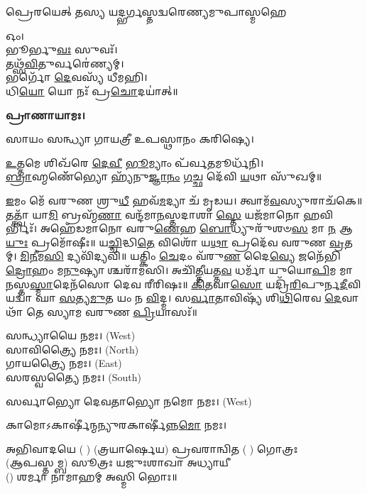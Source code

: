 {𑌪𑍍𑌰𑍇𑌰𑌯𑍇𑌤𑍍 𑌤𑌸𑍍𑌯 𑌯𑌦𑍍𑌭𑌰𑍍𑌗𑌸𑍍𑌤𑌦𑍍𑌵𑌰𑍇𑌣𑍍𑌯𑌮𑍁𑌪𑌾𑌸𑍍𑌮𑌹𑍇}


𑌓𑌂।\\
𑌭𑍂𑌰𑍍𑌭𑍁\-\ul{𑌵𑌃} 𑌸𑍁𑌵𑌃᳴।\\
𑌤𑌥𑍍𑌸᳴\-\ul{𑌵𑌿}\-𑌤𑍁𑌰𑍍𑌵𑌰𑍇॑𑌣𑍍𑌯𑌮𑍍।\\
𑌭𑌰𑍍𑌗𑍋᳴ \ul{𑌦𑍇}\-𑌵𑌸𑍍𑌯᳴ 𑌧𑍀𑌮𑌹𑌿।\\
𑌧𑌿\-\ul{𑌯𑍋} 𑌯𑍋 𑌨𑌃᳴ 𑌪𑍍𑌰\-\ul{𑌚𑍋}\-𑌦𑌯𑌾॑𑌤𑍍॥

\textbf{𑌪𑍍𑌰𑌾𑌣𑌾𑌯𑌾𑌮𑌃।}


𑌸𑌾𑌯𑌂 𑌸𑌨𑍍𑌧𑍍𑌯𑌾 𑌗𑌾𑌯𑌤𑍍𑌰𑍀 𑌉𑌪𑌸𑍍𑌥𑌾𑌨𑌂 𑌕𑌰𑌿𑌷𑍍𑌯𑍇।

\-\ul{𑌉}\-𑌤𑍍𑌤𑌮𑍇 𑌶𑌿𑌖᳴𑌰𑍇 \ul{𑌦𑍇}\-\-\ul{𑌵𑍀} \ul{𑌭𑍂}\-𑌮𑍍𑌯𑌾𑌂 𑌪᳴𑌰𑍍𑌵\-\ul{𑌤}\-𑌮𑍂𑌰𑍍𑌧᳴𑌨𑌿।\\
\-\ul{𑌬𑍍𑌰𑌾}\-𑌹𑍍𑌮𑌣𑍇᳴᳴𑌭𑍍𑌯𑍋 𑌹𑍍𑌯᳴𑌨𑍁\-\ul{𑌜𑍍𑌞𑌾}\-\-\ul{𑌨𑌂} \ul{𑌗}\-𑌚𑍍𑌛 𑌦𑍇᳴𑌵𑌿 \ul{𑌯}\-𑌥𑌾 𑌸𑍁᳴𑌖𑌮𑍍॥


\-\ul{𑌇}\-𑌮𑌂 𑌮𑍇᳴ 𑌵𑌰𑍁𑌣 𑌶𑍍𑌰𑍁\-\ul{𑌧𑍀} 𑌹𑌵᳴\-\ul{𑌮}\-𑌦𑍍𑌯𑌾 𑌚᳴ 𑌮𑍃𑌡𑌯। 𑌤𑍍𑌵𑌾𑌮᳴\-\ul{𑌵}\-𑌸𑍍𑌯𑍁𑌰𑌾𑌚᳴𑌕𑍇॥ 𑌤𑌤𑍍𑌤𑍍𑌵𑌾᳴ 𑌯𑌾\-\ul{𑌮𑌿} 𑌬𑍍𑌰𑌹𑍍𑌮᳴\-\ul{𑌣𑌾} 𑌵𑌨𑍍𑌦᳴𑌮𑌾\-\ul{𑌨}\-𑌸𑍍𑌤𑌦𑌾𑌶𑌾\-\ul{𑌸𑍍𑌤𑍇} 𑌯𑌜᳴𑌮𑌾𑌨𑍋 \ul{𑌹}\-𑌵𑌿𑌰𑍍𑌭𑌿𑌃᳴। 𑌅𑌹𑍇᳴𑌡𑌮𑌾𑌨𑍋 𑌵𑌰𑍁\-\ul{𑌣𑍇}\-𑌹 \ul{𑌬𑍋}\-𑌧𑍍𑌯𑍁𑌰𑍁᳴𑌶𑍞\-\ul{𑌸} 𑌮𑌾 \ul{𑌨} 𑌆\-\ul{𑌯𑍁𑌃} 𑌪𑍍𑌰𑌮𑍋᳴𑌷𑍀𑌃॥
𑌯\-\ul{𑌚𑍍𑌚𑌿}\-𑌦𑍍𑌧𑌿\-\ul{𑌤𑍇} 𑌵𑌿𑌶𑍋᳴ 𑌯\-\ul{𑌥𑌾} 𑌪𑍍𑌰𑌦𑍇᳴𑌵 𑌵𑌰𑍁𑌣 \ul{𑌵𑍍𑌰}\-𑌤𑌮𑍍। \ul{𑌮𑌿}\-\-\ul{𑌨𑍀}\-𑌮\-\ul{𑌸𑌿} 𑌦𑍍𑌯𑌵𑌿᳴𑌦𑍍𑌯𑌵𑌿॥ 𑌯𑌤𑍍𑌕𑌿𑌂 \ul{𑌚𑍇}\-𑌦𑌂 𑌵᳴𑌰𑍁\-\ul{𑌣} 𑌦𑍈\-\ul{𑌵𑍍𑌯𑍇} 𑌜𑌨𑍇᳴𑌭𑌿\-\ul{𑌦𑍍𑌰𑍋}\-𑌹𑌂 𑌮\-\ul{𑌨𑍁}\-𑌷𑍍𑌯𑌾𑌶𑍍𑌚𑌰𑌾᳴𑌮𑌸𑌿। 𑌅𑌚𑌿᳴\-\ul{𑌤𑍍𑌤𑍀}\-𑌯𑌤𑍍𑌤\-\ul{𑌵} 𑌧𑌰𑍍𑌮𑌾᳴ 𑌯𑍁𑌯𑍋\-\ul{𑌪𑌿}\-𑌮 𑌮𑌾 \ul{𑌨}\-𑌸𑍍𑌤\-\ul{𑌸𑍍𑌮𑌾}\-𑌦𑍇𑌨᳴𑌸𑍋 𑌦𑍇𑌵 𑌰𑍀𑌰𑌿𑌷𑌃॥ \ul{𑌕𑌿}\-\-\ul{𑌤}\-𑌵𑌾\-\ul{𑌸𑍋} 𑌯𑌦𑍍𑌰𑌿᳴\-\ul{𑌰𑌿}\-𑌪𑍁𑌰𑍍𑌨\-\ul{𑌦𑍀}\-𑌵𑌿 𑌯𑌦𑍍𑌵𑌾᳴ 𑌘𑌾 \ul{𑌸}\-𑌤𑍍𑌯\-\ul{𑌮𑍁}\-𑌤 𑌯𑌂 𑌨 \ul{𑌵𑌿}\-𑌦𑍍𑌮। 𑌸\-\ul{𑌰𑍍𑌵𑌾}\-𑌤𑌾𑌵𑌿𑌷𑍍𑌯᳴ 𑌶𑌿\-\ul{𑌥𑌿}\-𑌰𑍇𑌵 \ul{𑌦𑍇}\-𑌵𑌾𑌥𑌾᳴ 𑌤𑍇 𑌸𑍍𑌯𑌾𑌮 𑌵𑌰𑍁𑌣 \ul{𑌪𑍍𑌰𑌿}\-𑌯𑌾𑌸𑌃᳴॥


𑌸𑌨𑍍𑌧𑍍𑌯𑌾𑌯𑍈 𑌨𑌮𑌃।  {\scriptsize (West)}\\
𑌸𑌾𑌵𑌿𑌤𑍍𑌰𑍍𑌯𑍈 𑌨𑌮𑌃। {\scriptsize (North)}\\
𑌗𑌾𑌯𑌤𑍍𑌰𑍍𑌯𑍈 𑌨𑌮𑌃।  {\scriptsize (East)}\\
𑌸𑌰𑌸𑍍𑌵𑌤𑍍𑌯𑍈 𑌨𑌮𑌃।  {\scriptsize (South)}

𑌸𑌰𑍍𑌵𑌾𑌭𑍍𑌯𑍋 𑌦𑍇𑌵𑌤𑌾𑌭𑍍𑌯𑍋 𑌨𑌮𑍋 𑌨𑌮𑌃। {\scriptsize (West)}

𑌕𑌾𑌮𑍋𑌽𑌕𑌾𑌰𑍍\mbox{}𑌷𑍀॑𑌨𑍍𑌮𑌨𑍍𑌯𑍁𑌰𑌕𑌾𑌰𑍍\mbox{}𑌷𑍀॑𑌨𑍍𑌨\-\ul{𑌮𑍋} 𑌨𑌮𑌃।

𑌅𑌭𑌿𑌵𑌾𑌦𑌯𑍇 ( ) (𑌤𑍍𑌰𑌯𑌾𑌰𑍍𑌷𑍇𑌯) 𑌪𑍍𑌰𑌵𑌰𑌾𑌨𑍍𑌵𑌿𑌤 ( ) 𑌗𑍋𑌤𑍍𑌰𑌃\\
(𑌆𑌪𑌸𑍍𑌤𑌮𑍍𑌬) 𑌸𑍂𑌤𑍍𑌰𑌃 𑌯𑌜𑍁𑌃𑌶𑌾𑌖𑌾 𑌅𑌧𑍍𑌯𑌾𑌯𑍀\\
() 𑌶𑌰𑍍𑌮𑌾 𑌨𑌾𑌮𑌾𑌹𑌮𑍍 𑌅𑌸𑍍𑌮𑌿 𑌭𑍋𑌃॥

